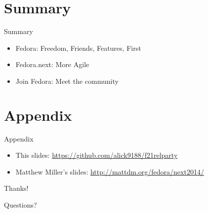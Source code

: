 \documentclass{beamer}
\begin{document}
\section*{Summary}

\begin{frame}{Summary}
  \begin{itemize}
  \item Fedora: Freedom, Friends, Features, First
  \item Fedora.next: More Agile
  \item Join Fedora: Meet the community
  \end{itemize}
\end{frame}

\section*{Appendix}

\begin{frame}{Appendix}
  \begin{itemize}
    \item This slides: \url{https://github.com/alick9188/f21relparty}
    \item Matthew Miller's slides: \url{http://mattdm.org/fedora/next2014/}
  \end{itemize}
\end{frame}

\begin{frame}
  \begin{center}
    {\LARGE Thanks!
    \bigskip

    Questions?}

  \end{center}
\end{frame}
\end{document}
